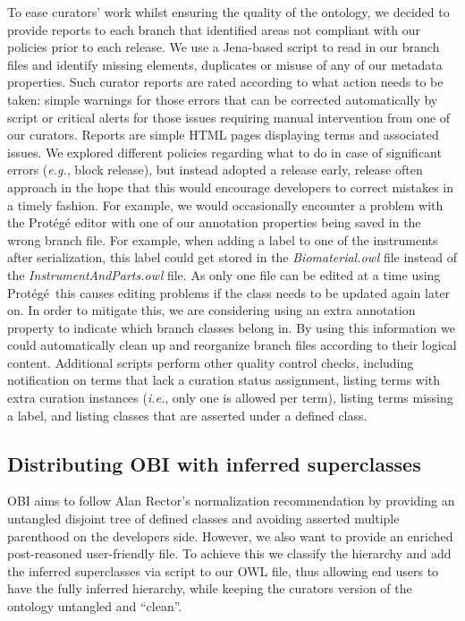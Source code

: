 \documentclass{elsart}       %
\begin{document}
To ease curators' work whilst ensuring the quality of the ontology, we decided to provide reports to each branch that identified areas not compliant with our policies prior to each release.
We use a Jena-based\cite{jena} script to read in our branch files and identify missing elements, duplicates or misuse of any of our metadata properties.
Such curator reports are rated according to what action needs to be taken: simple warnings for those errors that can be corrected automatically by script or critical alerts for those issues requiring manual intervention from one of our curators. Reports are simple HTML pages displaying terms and associated issues.
We explored different policies regarding what to do in case of significant errors (\emph{e.g.}, block release), but instead adopted a release early, release often approach in the hope that this would encourage developers to correct mistakes in a timely fashion.
For example, we would occasionally encounter a problem with the Prot\'eg\'e\cite{protege} editor with one of our annotation properties being saved in the wrong branch file. For example, when adding a label to one of the instruments after serialization, this label could get stored in the \emph{Biomaterial.owl} file instead of the \emph{InstrumentAndParts.owl} file. 
As only one file can be edited at a time using Prot\'eg\'e\, this causes editing problems if the class needs to be updated again later on.
In order to mitigate this, we are considering using an extra annotation property to indicate which branch classes belong in.
By using this information we could automatically clean up and reorganize branch files according to their logical content.
Additional scripts perform other quality control checks, including notification on terms that lack a curation status assignment, listing terms with extra curation instances (\emph{i.e.}, only one is allowed per term), listing terms missing a label, and listing classes that are asserted under a defined class.

\subsection{Distributing OBI with inferred superclasses}

OBI aims to follow Alan Rector's\cite{rector} normalization recommendation by providing an untangled disjoint tree of defined classes and avoiding asserted multiple parenthood on the developers side. However, we also want to provide an enriched post-reasoned user-friendly file.
To achieve this we classify the hierarchy and add the inferred superclasses via script to our OWL file, thus allowing end users to have the fully inferred hierarchy, while keeping the curators version of the ontology untangled and ``clean''.
\end{document}
